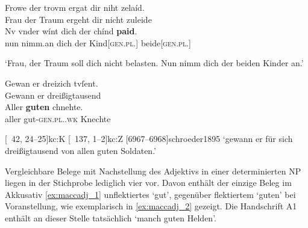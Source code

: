 \begin{exe}
\ex \label{ex:chindpaid}
\begin{xlist}
	\ex \label{ex:chindpaid_1}
		\gll Frowe der trovm ergat dir niht zelaíd. \\
			Frau der Traum ergeht dir nicht zuleide \\
	\sn \gll Nv {vnder wínt} dich der chínd \textbf{paid}. \\
			nun nimm.an dich der Kind[\textsc{gen.pl.\NeutM}]
			beide[\textsc{gen.pl.\NeutM}] \\
		\begin{taggedline}{\parencites%
			[\pno~11\ra, 17]{kc:M}[vgl.]%
			[\pno~6\rb, 22--23]{kc:A1}
			[\pno~8\ra, 12--13]{kc:H}
			[1354]{schroeder1895}
		} %
		\trans `Frau, der Traum soll dich nicht belasten. Nun nimm dich der
			beiden Kinder an.'
		\end{taggedline}

	\ex \label{ex:chindpaid_2}
		\gll Gewan er {dreizich tvſent}. \\
			Gewann er dreißigtausend \\
	\sn \gll Aller \textbf{guten} chnehte. \\
			aller gut-\textsc{gen.pl.\MascM.wk} Knechte \\
		\begin{taggedline}{\parencites%
			[\pno~52\vb, 20--21]{kc:M}[vgl.]%
			[\pno~30\rb, 14--15]{kc:A1}
			[\pno~41\rb, 36--37]{kc:H}
			[\pno~19\vc, 23--24]{kc:B1}
			[\pno~33\vb, 20--21]{kc:VB}
			[\pno~42\ra, 24--25]{kc:K}
			[\pno~137\va, 1--2]{kc:Z}
			[6967--6968]{schroeder1895}
		}
		\trans `gewann er  für sich dreißigtausend
			von allen guten Soldaten.'
		\end{taggedline}
\end{xlist}
\end{exe}

Vergleichbare Belege mit Nachstellung des Adjektivs in einer determinierten NP
liegen in der Stichprobe lediglich vier vor. Davon enthält der einzige Beleg im
Akkusativ \cref{ex:maccadj_1} unflektiertes  `gut', gegenüber
flektiertem  `guten' bei Voranstellung, wie exemplarisch in
\cref{ex:maccadj_2} gezeigt. Die Handschrift A1 enthält an dieser
Stelle %
tatsächlich  `manch guten Helden'.

